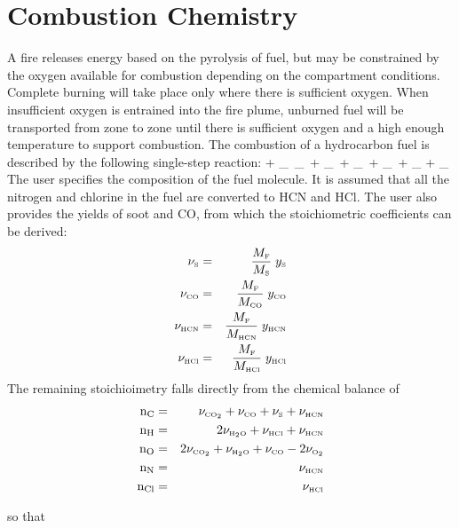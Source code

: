 \section{Combustion Chemistry}

A fire releases energy based on the pyrolysis of fuel, but may be constrained by the oxygen available for combustion depending on the compartment conditions. Complete burning will take place only where there is sufficient oxygen. When insufficient oxygen is entrained into the fire plume, unburned fuel will be transported from zone to zone until there is sufficient oxygen and a high enough temperature to support combustion. The combustion of a hydrocarbon fuel is described by the following single-step reaction:
\be  {} +  \nu_\OTWO \,   \rightarrow  \nu_\COTWO \,  + \nu_\HTWOO \,  + \nu_\CO \,  +
     \nu_\So \,   + \nu_\HCl {} + \nu_\HCN {} \label{stoich} 
\ee
The user specifies the composition of the fuel molecule. It is assumed that all the nitrogen and chlorine in the fuel are converted to HCN and HCl. The user also provides the yields of soot and CO, from which the stoichiometric coefficients can be derived:
\begin{eqnarray}
   \nu_{\tiny \hbox{S}} &=& \frac{M_{\tiny \hbox{F}}}{M_{\tiny \hbox{S}}} \; y_{\tiny \hbox{S}} \label{soot_yield} \\
   \nu_{\tiny \hbox{CO}} &=& \frac{M_{\tiny \hbox{F}}}{M_{\tiny \hbox{CO}}} \; y_{\tiny \hbox{CO}} \label{CO_yield} \\
   \nu_{\tiny \hbox{HCN}} &=& \frac{M_{\tiny \hbox{F}}}{M_{\tiny \hbox{HCN}}} \; y_{\tiny \hbox{HCN}} \label{HCN_yield} \\
   \nu_{\tiny \hbox{HCl}} &=& \frac{M_{\tiny \hbox{F}}}{M_{\tiny \hbox{HCl}}} \; y_{\tiny \hbox{HCl}} \label{HCl_yield} 
\end{eqnarray}
The remaining stoichioimetry falls directly from the chemical balance of
\begin{eqnarray}
\mathrm{n_C} &=& \nu_{\tiny \hbox{CO}_2} + \nu_{\tiny \hbox{CO}} + \nu_{\tiny \hbox{S}} + \nu_{\tiny \hbox{HCN}} \\
\mathrm{n_H} &=& 2 \nu_{\tiny \hbox{H}_2\hbox{O}} + \nu_{\tiny \hbox{HCl}} + \nu_{\tiny \hbox{HCN}} \\
\mathrm{n_O} &=& 2 \nu_{\tiny \hbox{CO}_2} + \nu_{\tiny \hbox{H}_2\hbox{O}} + \nu_{\tiny \hbox{CO}} - 2 \nu_{\tiny \hbox{O}_2} \\
\mathrm{n_{N}} &=& \nu_{\tiny \hbox{HCN}} \\
\mathrm{n_{Cl}} &=& \nu_{\tiny \hbox{HCl}}
\end{eqnarray}

so that

